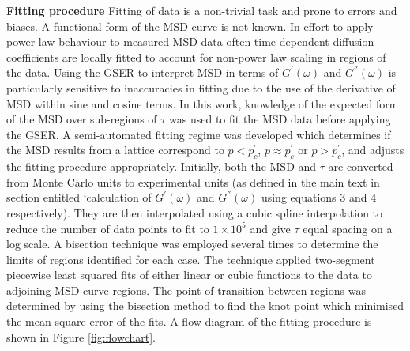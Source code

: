 \documentclass[%
 aip,
 amsmath,amssymb,
reprint, onecolumn %
]{revtex4-1}
\begin{document}
\textbf{Fitting procedure}
Fitting of data is a non-trivial task and prone to errors and biases. A functional form of the MSD curve is not known. In effort to apply power-law behaviour to measured MSD data often time-dependent diffusion coefficients are locally fitted to account for non-power law scaling in regions of the data. Using the GSER to interpret MSD in terms of $G^{'} (\omega)$ and $G^{''} (\omega)$ is particularly sensitive to inaccuracies in fitting due to the use of the derivative of MSD within sine and cosine terms.
In this work, knowledge of the expected form of the MSD over sub-regions of $\tau$ was used to fit the MSD data before applying the GSER. A semi-automated fitting regime was developed which determines if the MSD results from a lattice correspond to  $p<p_c^{'}$,  $p\approx p_c^{'}$ or $p>p_c^{'}$, and adjusts the fitting procedure appropriately. Initially, both the MSD and $\tau$ are converted from Monte Carlo units to experimental units (as defined in the main text in section entitled ‘calculation of $G^{'} (\omega)$ and $G^{''} (\omega)$ using equations 3 and 4 respectively). They are then interpolated using a cubic spline interpolation to reduce the number of data points to fit to $1\times10^5$ and give $\tau$ equal spacing on a log scale. A bisection technique was employed several times to determine the limits of regions identified for each case. The technique applied two-segment piecewise least squared fits of either linear or cubic functions to the data to adjoining MSD curve regions. The point of transition between regions was determined by using the bisection method to find the knot point which minimised the mean square error of the fits. A flow diagram of the fitting procedure is shown in Figure \ref{fig:flowchart}.
\end{document}
